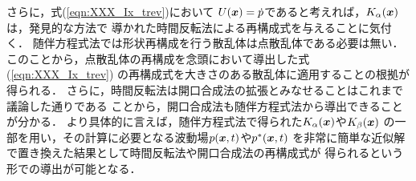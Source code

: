 さらに，式(\ref{eqn:XXX_Ix_trev})において
$U(\mbox{\boldmath $x$})=\dot{p}$であると考えれば，$K_\alpha(\mbox{\boldmath $x$})$は，発見的な方法で
導かれた時間反転法による再構成式を与えることに気付く．
随伴方程式法では形状再構成を行う散乱体は点散乱体である必要は無い．
このことから，点散乱体の再構成を念頭において導出した式(\ref{eqn:XXX_Ix_trev})
の再構成式を大きさのある散乱体に適用することの根拠が得られる．
さらに，時間反転法は開口合成法の拡張とみなせることはこれまで議論した通りである
ことから，開口合成法も随伴方程式法から導出できることが分かる．
より具体的に言えば，随伴方程式法で得られた$K_\alpha(\mbox{\boldmath $x$})$や$K_\beta(\mbox{\boldmath $x$})$
の一部を用い，その計算に必要となる波動場$ p(\mbox{\boldmath $x$},t)$や$p^*(\mbox{\boldmath $x$},t)$
を非常に簡単な近似解で置き換えた結果として時間反転法や開口合成法の再構成式が
得られるという形での導出が可能となる．

